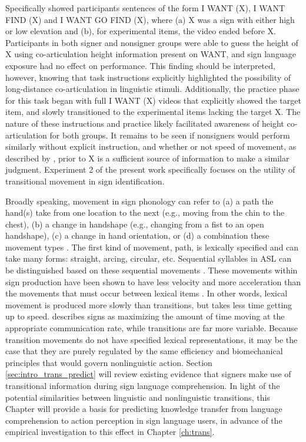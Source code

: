                 Specifically  showed participants sentences of the form I WANT (X), I WANT FIND (X) and I WANT GO FIND (X), where (a) X was a sign with either high or low elevation and (b), for experimental items, the video ended before X. Participants in both signer and nonsigner groups were able to guess the height of X using co-articulation height information present on WANT, and sign language exposure had no effect on performance. This finding should be interpreted, however, knowing that task instructions explicitly highlighted the possibility of long-distance co-articulation in linguistic stimuli. Additionally, the practice phase for this task began with full I WANT (X) videos that explicitly showed the target item, and slowly transitioned to the experimental items lacking the target X. The nature of these instructions and practice likely facilitated awareness of height co-articulation for both groups. It remains to be seen if nonsigners would perform similarly without explicit instruction, and whether or not speed of movement, as described by , prior to X is a sufficient source of information to make a similar judgment. Experiment 2 of the present work specifically focuses on the utility of transitional movement in sign identification. \par
                Broadly speaking, movement in sign phonology can refer to (a) a path the hand(s) take from one location to the next (e.g., moving from the chin to the chest), (b) a change in handshape (e.g., changing from a fist to an open handshape), (c) a change in hand orientation, or (d) a combination these movement types \cite{sandler2006}. The first kind of movement, path, is lexically specified and can take many forms: straight, arcing, circular, etc. Sequential syllables in ASL can be distinguished based on these sequential movements \cite{corina1993}. These movements within sign production have been shown to have less velocity and more acceleration than the movements that must occur between lexical items \cite{jantunen2013}. In other words, lexical movement is produced more slowly than transitions, but takes less time getting up to speed.  describes signs as maximizing the amount of time moving at the appropriate communication rate, while transitions are far more variable. Because transition movements do not have specified lexical representations, it may be the case that they are purely regulated by the same efficiency and biomechanical principles that would govern nonlinguistic action. Section \ref{sec:intro_trans_predict} will review existing evidence that signers make use of transitional information during sign language comprehension. In light of the potential similarities between linguistic and nonlinguistic transitions, this Chapter will provide a basis for predicting knowledge transfer from language comprehension to action perception in sign language users, in advance of the empirical investigation to this effect in Chapter \ref{ch:trans}. \par
